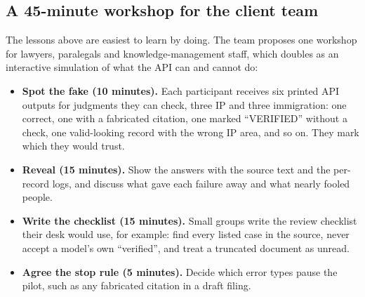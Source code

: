 \documentclass[10pt,letterpaper]{article}
\begin{document}
\subsection{A 45-minute workshop for the client team}
The lessons above are easiest to learn by doing. The team proposes one workshop for lawyers, paralegals and knowledge-management staff, which doubles as an interactive simulation of what the API can and cannot do:
\begin{itemize}
\item \textbf{Spot the fake (10 minutes).} Each participant receives six printed API outputs for judgments they can check, three IP and three immigration: one correct, one with a fabricated citation, one marked ``VERIFIED'' without a check, one valid-looking record with the wrong IP area, and so on. They mark which they would trust.
\item \textbf{Reveal (15 minutes).} Show the answers with the source text and the per-record logs, and discuss what gave each failure away and what nearly fooled people.
\item \textbf{Write the checklist (15 minutes).} Small groups write the review checklist their desk would use, for example: find every listed case in the source, never accept a model's own ``verified'', and treat a truncated document as unread.
\item \textbf{Agree the stop rule (5 minutes).} Decide which error types pause the pilot, such as any fabricated citation in a draft filing.
\end{itemize}

\end{document}
